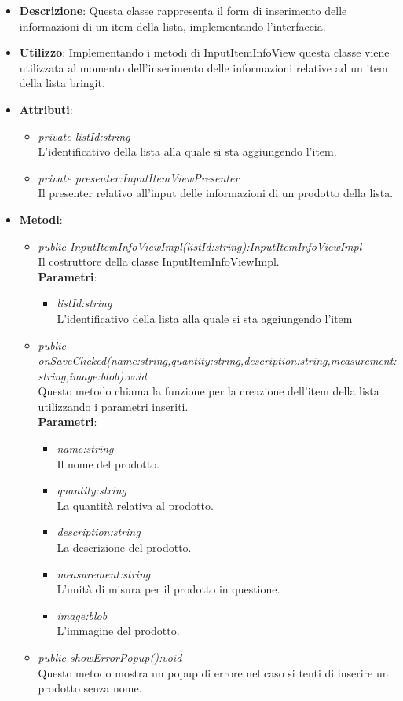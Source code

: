 \begin{itemize}
\item \textbf{Descrizione}: Questa classe rappresenta il form di inserimento delle informazioni di un item della lista, implementando l'interfaccia.
\item \textbf{Utilizzo}: Implementando i metodi di InputItemInfoView questa classe viene utilizzata al momento dell'inserimento delle informazioni relative ad un item della lista bringit.
\item \textbf{Attributi}: 
	\begin{itemize}
	\item \textit{private listId:string}\\
	L'identificativo della lista alla quale si sta aggiungendo l'item.
	\item \textit{private presenter:InputItemViewPresenter}\\
	Il presenter relativo all'input delle informazioni di un prodotto della lista.
	\end{itemize}
\item \textbf{Metodi}:
	\begin{itemize}
	\item \textit{public InputItemInfoViewImpl(listId:string):InputItemInfoViewImpl}\\
	Il costruttore della classe InputItemInfoViewImpl.
					\\ \textbf{Parametri}: \begin{itemize}
			\item \textit{listId:string}\\
			L'identificativo della lista alla quale si sta aggiungendo l'item
					\end{itemize} 
	\item \textit{public onSaveClicked(name:string,quantity:string,description:string,measurement:string,image:blob):void}\\
	Questo metodo chiama la funzione per la creazione dell'item della lista utilizzando i parametri inseriti.
				\\ \textbf{Parametri}: \begin{itemize}
			\item \textit{name:string}\\
			Il nome del prodotto.
			\item \textit{quantity:string}\\
			La quantità relativa al prodotto.
			\item \textit{description:string}\\
			La descrizione del prodotto.
			\item \textit{measurement:string}\\
			L'unità di misura per il prodotto in questione.
			\item \textit{image:blob}\\
			L'immagine del prodotto.
					\end{itemize} 
		\item \textit{public showErrorPopup():void}\\
		Questo metodo mostra un popup di errore nel caso si tenti di inserire un prodotto senza nome.	
	\end{itemize}
\end{itemize}

